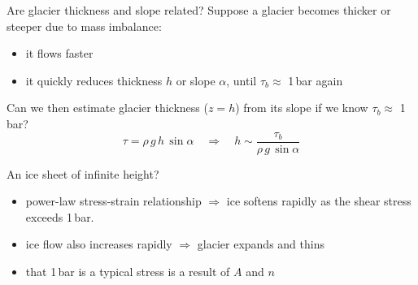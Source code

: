 \documentclass[hide notes,intlimits,unknownkeysallowed]{beamer}
\newcommand{\epsdot}{\dot{\varepsilon}}
\begin{document}
\begin{frame}{Are glacier thickness and slope related?}
  Suppose a glacier becomes thicker or steeper due to mass imbalance:
  \begin{itemize}
    \item it flows faster
    \item it quickly reduces thickness $h$ or slope $\alpha$, until $\tau_{b} \approx$ 1\,bar again
  \end{itemize}
  Can we then estimate glacier thickness ($z=h$) from its slope if we know $\tau_{b} \approx$ 1\,bar?
  \begin{displaymath}
    \tau = \rho\,g\,h\,\sin{\alpha} \quad \Rightarrow \quad h \sim \frac{\tau_{b}}{\rho\,g\,\sin{\alpha}}
  \end{displaymath}
\end{frame}


\begin{frame}{An ice sheet of infinite height?}
\begin{itemize}
  \item power-law stress-strain relationship $\Rightarrow$ ice softens
    rapidly as the shear stress exceeds 1\,bar.
  \item ice flow also increases rapidly $\Rightarrow$ glacier expands
    and thins
  \item that 1\,bar is a typical stress is a result of $A$ and $n$
\end{itemize}

\end{frame}


\end{document}
